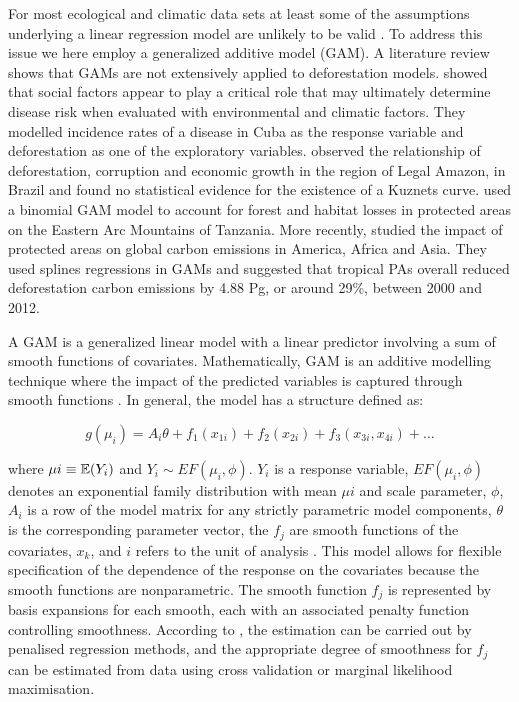 For most ecological and climatic data sets at least some of the assumptions underlying a linear regression model are unlikely to be valid \citep{zuur_2011}.   To address this issue we here employ a generalized additive model (GAM). A literature review shows that GAMs are not extensively applied to deforestation models. \citet{COHEN_2008} showed that social factors appear to play a critical role that may ultimately determine disease risk when evaluated with environmental and climatic factors. They modelled incidence rates of a disease in Cuba as the response variable and deforestation as one of the exploratory variables. \citet{MENDES_2012} observed the relationship of deforestation, corruption and economic growth in the region of Legal Amazon, in Brazil and found no statistical evidence for the existence of a Kuznets curve. \citet{GREEN_2013} used a binomial GAM model to account for forest and habitat losses in protected areas on the Eastern Arc Mountains of Tanzania. More recently, \citet{BEBBER_2017} studied the impact of protected areas on global carbon emissions in America, Africa and Asia. They used splines regressions in GAMs and suggested that tropical PAs overall reduced deforestation carbon emissions by 4.88 Pg, or around 29\%, between 2000 and 2012. 


A GAM is a generalized linear model with a linear predictor involving a sum of smooth functions of covariates. Mathematically, GAM is an additive modelling technique where the impact of the predicted variables is captured through smooth functions \citep{larsen_2015}. In general, the model has a structure defined as: 

\begin{equation}  \label{eq:3} 
g(\mu_{i}) = A_{i} \theta + f_{1}(x_{1i}) + f_{2}(x_{2i}) + f_{3}(x_{3i},x_{4i}) + \dots
\end{equation}

where $\mu{i} \equiv \displaystyle \operatorname{\mathbb{E}}(Y_{i})$ and $Y_{i} \sim EF(\mu_{i},\phi)$. $Y_{i}$ is a response variable, $EF(\mu_{i},\phi)$ denotes an exponential family distribution with mean $\mu{i}$ and scale parameter, $\phi$, $ A_{i}$ is a row of the model matrix for any strictly parametric model components, $\theta$ is the corresponding parameter vector, the $f_{j}$ are smooth functions of the covariates, $x_{k}$, and ${i}$ refers to the unit of analysis \citep{Wood_2017}. This model allows for flexible specification of the dependence of the response on the covariates because the smooth functions are nonparametric. The smooth function $f_{j}$ is represented by basis expansions for each smooth, each with an associated penalty function controlling  smoothness. According to \citet{Wood_2004, Wood_2017}, the estimation can be carried out by penalised regression methods, and the appropriate degree of smoothness for $f_{j}$ can be estimated from data using cross validation or marginal likelihood maximisation.

